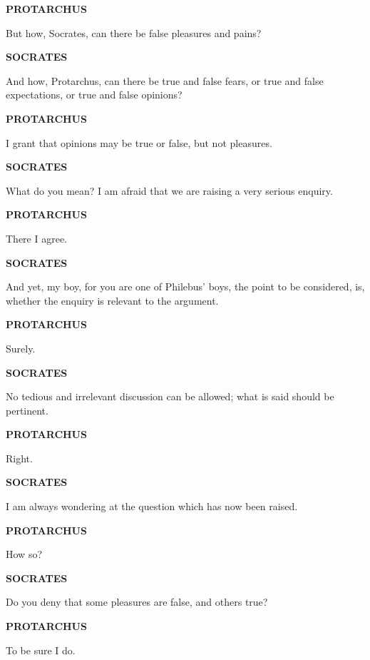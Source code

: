 \documentclass[11pt,letter]{article}
\begin{document}
\par \textbf{PROTARCHUS}
\par   But how, Socrates, can there be false pleasures and pains?

\par \textbf{SOCRATES}
\par   And how, Protarchus, can there be true and false fears, or true and false expectations, or true and false opinions?

\par \textbf{PROTARCHUS}
\par   I grant that opinions may be true or false, but not pleasures.

\par \textbf{SOCRATES}
\par   What do you mean? I am afraid that we are raising a very serious enquiry.

\par \textbf{PROTARCHUS}
\par   There I agree.

\par \textbf{SOCRATES}
\par   And yet, my boy, for you are one of Philebus' boys, the point to be considered, is, whether the enquiry is relevant to the argument.

\par \textbf{PROTARCHUS}
\par   Surely.

\par \textbf{SOCRATES}
\par   No tedious and irrelevant discussion can be allowed; what is said should be pertinent.

\par \textbf{PROTARCHUS}
\par   Right.

\par \textbf{SOCRATES}
\par   I am always wondering at the question which has now been raised.

\par \textbf{PROTARCHUS}
\par   How so?

\par \textbf{SOCRATES}
\par   Do you deny that some pleasures are false, and others true?

\par \textbf{PROTARCHUS}
\par   To be sure I do.
\end{document}
